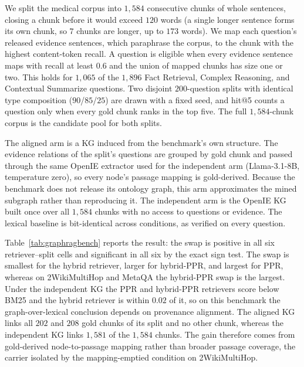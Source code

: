 \documentclass[11pt]{article}
\begin{document}
We split the medical corpus into $1{,}584$ consecutive chunks of whole sentences, closing a chunk before it would exceed $120$ words (a single longer sentence forms its own chunk, so $7$ chunks are longer, up to $173$ words). We map each question's released evidence sentences, which paraphrase the corpus, to the chunk with the highest content-token recall. A question is eligible when every evidence sentence maps with recall at least $0.6$ and the union of mapped chunks has size one or two. This holds for $1{,}065$ of the $1{,}896$ Fact Retrieval, Complex Reasoning, and Contextual Summarize questions. Two disjoint $200$-question splits with identical type composition ($90$/$85$/$25$) are drawn with a fixed seed, and hit@5 counts a question only when every gold chunk ranks in the top five. The full $1{,}584$-chunk corpus is the candidate pool for both splits.

The aligned arm is a KG induced from the benchmark's own structure. The evidence relations of the split's questions are grouped by gold chunk and passed through the same OpenIE extractor used for the independent arm (Llama-3.1-8B, temperature zero), so every node's passage mapping is gold-derived. Because the benchmark does not release its ontology graph, this arm approximates the mined subgraph rather than reproducing it. The independent arm is the OpenIE KG built once over all $1{,}584$ chunks with no access to questions or evidence. The lexical baseline is bit-identical across conditions, as verified on every question.

Table~\ref{tab:graphragbench} reports the result: the swap is positive in all six retriever--split cells and significant in all six by the exact sign test. The swap is smallest for the hybrid retriever, larger for hybrid-PPR, and largest for PPR, whereas on 2WikiMultiHop and MetaQA the hybrid-PPR swap is the largest. Under the independent KG the PPR and hybrid-PPR retrievers score below BM25 and the hybrid retriever is within $0.02$ of it, so on this benchmark the graph-over-lexical conclusion depends on provenance alignment. The aligned KG links all $202$ and $208$ gold chunks of its split and no other chunk, whereas the independent KG links $1{,}581$ of the $1{,}584$ chunks. The gain therefore comes from gold-derived node-to-passage mapping rather than broader passage coverage, the carrier isolated by the mapping-emptied condition on 2WikiMultiHop.
\end{document}
